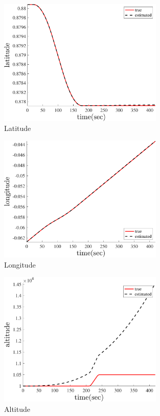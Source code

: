     \begin{figure}[H]
        \centering
        \includegraphics[width=0.7\textwidth]{../Figure/Q5/latitude_cos}
        \caption{Latitude}
    \end{figure}
    \begin{figure}[H]
        \centering
        \includegraphics[width=0.7\textwidth]{../Figure/Q5/longitude_cos}
        \caption{Longitude}
    \end{figure}
    \begin{figure}[H]
        \centering
        \includegraphics[width=0.7\textwidth]{../Figure/Q5/altitude_cos}
        \caption{Altitude}
    \end{figure}
